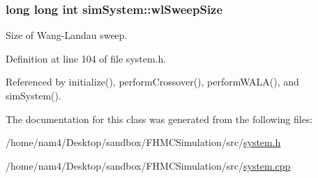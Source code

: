 \hypertarget{classsim_system_ae625e1026daee4f99f83fb73881875a1}{
\subsubsection[{wl\-Sweep\-Size}]{\setlength{\rightskip}{0pt plus 5cm}long long int sim\-System\-::wl\-Sweep\-Size}}\label{classsim_system_ae625e1026daee4f99f83fb73881875a1}


Size of Wang-\/\-Landau sweep. 



Definition at line 104 of file system.\-h.



Referenced by initialize(), perform\-Crossover(), perform\-W\-A\-L\-A(), and sim\-System().



The documentation for this class was generated from the following files\-:\begin{DoxyCompactItemize}
\item 
/home/nam4/\-Desktop/sandbox/\-F\-H\-M\-C\-Simulation/src/\hyperlink{system_8h}{system.\-h}\item 
/home/nam4/\-Desktop/sandbox/\-F\-H\-M\-C\-Simulation/src/\hyperlink{system_8cpp}{system.\-cpp}\end{DoxyCompactItemize}
